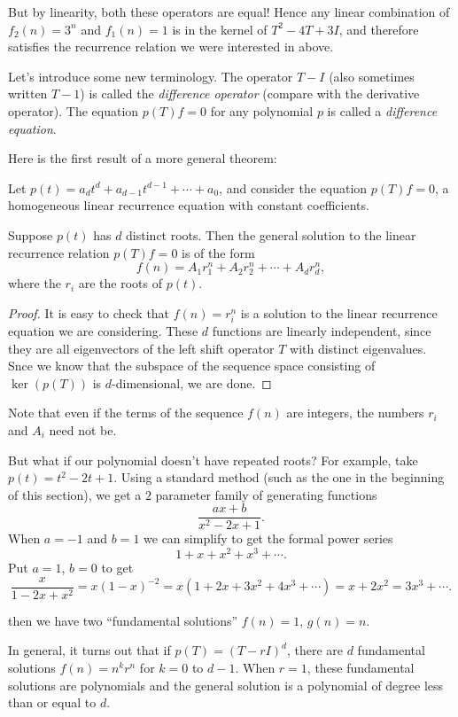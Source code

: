 But by linearity, both these operators are equal! Hence any linear combination of $f_2(n) = 3^n$ and $f_1(n) = 1$ is in the kernel of $T^2 - 4T + 3I$, and therefore satisfies the recurrence relation we were interested in above.

Let's introduce some new terminology. The operator $T - I$ (also sometimes written $T - 1$) is called the \textit{difference operator} (compare with the derivative operator). The equation $p(T)f = 0$ for any polynomial $p$ is called a \textit{difference equation}.

Here is the first result of a more general theorem:
\begin{theorem}
Let $p(t) = a_dt^d + a_{d-1}t^{d-1} + \cdots + a_0$, and consider the equation $p(T)f = 0$, a homogeneous linear recurrence equation with constant coefficients.

Suppose $p(t)$ has $d$ distinct roots. Then the general solution to the linear recurrence relation $p(T)f = 0$ is of the form
\[f(n) = A_1r_1^n + A_2r_2^n + \cdots + A_dr_d^n,\] where the $r_i$ are the roots of $p(t)$.
\end{theorem}
\begin{proof}
It is easy to check that $f(n) = r_i^n$ is a solution to the linear recurrence equation we are considering. These $d$ functions are linearly independent, since they are all eigenvectors of the left shift operator $T$ with distinct eigenvalues.  Snce we know that the subspace of the sequence space consisting of $\ker(p(T))$ is $d$-dimensional, we are done.
\end{proof}

Note that even if the terms of the sequence $f(n)$ are integers, the numbers $r_i$ and $A_i$ need not be. 

But what if our polynomial doesn't have repeated roots? For example, take $p(t) = t^2 - 2t + 1$. Using a standard method (such as the one in the beginning of this section), we get a $2$ parameter family of generating functions
\[\frac{ax + b}{x^2 - 2x + 1}.\] When $a = -1$ and $b = 1$ we can simplify to get the formal power series
\[1 + x + x^2 + x^3 + \cdots.\]
Put $a=  1$, $b = 0$ to get
\[\frac{x}{1-2x + x^2} = x(1-x)^{-2} = x(1 + 2x + 3x^2 + 4x^3 + \cdots) = x + 2x^2 = 3x^3 + \cdots.\]

then we have two ``fundamental solutions'' $f(n) = 1$, $g(n) = n$.

In general, it turns out that if $p(T) = (T - rI)^d$, there are $d$ fundamental solutions $f(n) = n^kr^n$ for $k = 0$ to $d-1$. When $r = 1$, these fundamental solutions are polynomials and the general solution is a polynomial of degree less than or equal to $d$.

